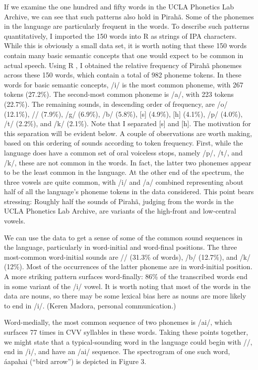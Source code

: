 \documentclass[output=paper,colorlinks,citecolor=brown
]{langscibook}
\begin{document}
    If we examine the one hundred and fifty words in the UCLA Phonetics Lab Archive, we can see that such patterns also hold in Pirahã. Some of the phonemes in the language are particularly frequent in the words. To describe such patterns quantitatively, I imported the 150 words into R as strings of IPA characters. While this is obviously a small data set, it is worth noting that these 150 words contain many basic semantic concepts that one would expect to be common in actual speech. Using R \citep{venables2003r}, I obtained the relative frequency of Pirahã phonemes across these 150 words, which contain a total of 982 phoneme tokens. In these words for basic semantic concepts, /i/ is the most common phoneme, with 267 tokens (27.2\%). The second-most common phoneme is /a/, with 223 tokens (22.7\%). The remaining sounds, in descending order of frequency, are /o/ (12.1\%), /{\textglotstop}/ (7.9\%), /g/ (6.9\%), /b/ (5.8\%), [s] (4.9\%), [h] (4.1\%), /p/ (4.0\%), /t/ (2.2\%), and /k/ (2.1\%). Note that I separated [s] and [h]. The motivation for this separation will be evident below. A couple of observations are worth making, based on this ordering of sounds according to token frequency. First, while the language does have a common set of oral voiceless stops, namely /p/, /t/, and /k/, these are not common in the words. In fact, the latter two phonemes appear to be the least common in the language. At the other end of the spectrum, the three vowels are quite common, with /i/ and /a/ combined representing about half of all the language’s phoneme tokens in the data considered. This point bears stressing: Roughly half the sounds of Pirahã, judging from the words in the UCLA Phonetics Lab Archive, are variants of the high-front and low-central vowels.

    We can use the data to get a sense of some of the common sound sequences in the language, particularly in word-initial and word-final positions. The three most-common word-initial sounds are /{\textglotstop}/ (31.3\% of words), /b/ (12.7\%), and /k/ (12\%). Most of the occurrences of the latter phoneme are in word-initial position. A more striking pattern surfaces word-finally: 86\% of the transcribed words end in some variant of the /i/ vowel. It is worth noting that most of the words in the data are nouns, so there may be some lexical bias here as nouns are more likely to end in /i/. (Keren Madora, personal communication.)

    Word-medially, the most common sequence of two phonemes is /ai/, which surfaces 77 times in CVV syllables in these words. Taking these points together, we might state that a typical-sounding word in the language could begin with /{\textglotstop}/, end in /i/, and have an /ai/ sequence. The spectrogram of one such word, {\textglotstop}áapahai (“bird arrow”) is depicted in Figure 3.
\end{document}

